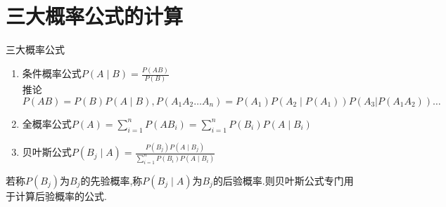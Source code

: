 \documentclass[12pt, a4paper, oneside, UTF8]{ctexbook}
\begin{document}
\section{三大概率公式的计算}
\begin{remark}
    三大概率公式
    \begin{enumerate}
    \item 条件概率公式\qquad $P(A\mid B)=\frac{P(AB)}{P(B)}$ \\
    推论 $P(AB)=P(B)P(A\mid B), P(A_1A_2\ldots A_n)=P(A_1)P(A_2\mid P(A_1))P(A_3|P(A_1A_2))\ldots$
    \item 全概率公式\qquad $P(A)=\sum_{i=1}^{n}P(AB_i)=\sum_{i=1}^{n}P(B_i)P(A\mid B_i)$
    \item 贝叶斯公式\qquad $P(B_j\mid A)=\frac{P(B_j)P(A\mid B_j)}{\sum_{i=1}^{n}P(B_i)P(A\mid B_i)}$
    \end{enumerate}
    若称$P(B_j)$为$B_j$的先验概率,称$P(B_j\mid A)$为$B_j$的后验概率.则贝叶斯公式专门用于计算后验概率的公式.
\end{remark}
\end{document}
